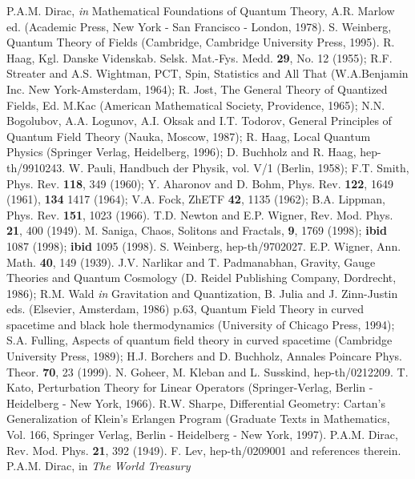 \documentclass[a4paper,12pt]{article}%
\begin{document}
\begin{thebibliography}{99}
 P.A.M. Dirac, {\it in} Mathematical Foundations of
Quantum Theory, A.R. Marlow ed. (Academic Press, New York -
San Francisco - London, 1978).
 S. Weinberg, Quantum Theory of Fields  
(Cambridge, Cambridge University Press, 1995).
 R. Haag, Kgl. Danske Videnskab. Selsk. Mat.-Fys. Medd.
{\bf 29}, No. 12  (1955); R.F. Streater and A.S. Wightman, 
PCT, Spin, Statistics and All That (W.A.Benjamin Inc. 
New York-Amsterdam, 1964);
R. Jost, The General Theory of Quantized Fields, Ed. M.Kac
(American Mathematical Society, Providence, 1965);
N.N. Bogolubov, A.A. Logunov, A.I. Oksak and I.T. Todorov,
General Principles of Quantum Field Theory (Nauka, Moscow, 1987);
R. Haag, Local Quantum Physics (Springer Verlag,
Heidelberg, 1996); D. Buchholz and R. Haag, hep-th/9910243.
 W. Pauli, Handbuch der Physik, vol. V/1
(Berlin, 1958); F.T. Smith, Phys. Rev. {\bf 118}, 349 (1960);
Y. Aharonov and D. Bohm, Phys. Rev. {\bf 122}, 1649 (1961),
{\bf 134} 1417 (1964); V.A. Fock, ZhETF {\bf 42}, 1135 (1962);
B.A. Lippman, Phys. Rev. {\bf 151}, 1023 (1966).
 T.D. Newton and E.P. Wigner, Rev. Mod. Phys.
{\bf 21}, 400 (1949). 
 M. Saniga, Chaos, Solitons and Fractals, 
{\bf 9}, 1769 (1998);  {\bf ibid} 1087 (1998); {\bf ibid}
1095 (1998).
 S. Weinberg, hep-th/9702027.
 E.P. Wigner, Ann. Math. {\bf 40}, 149 (1939).
 J.V. Narlikar and T. Padmanabhan,
Gravity, Gauge Theories and Quantum Cosmology (D. Reidel
Publishing Company, Dordrecht, 1986);
R.M. Wald {\it in} Gravitation and
Quantization, B. Julia and J. Zinn-Justin eds. (Elsevier,
Amsterdam, 1986) p.63, Quantum Field Theory in curved
spacetime and black hole thermodynamics (University of
Chicago Press, 1994);
S.A. Fulling, Aspects of quantum field
theory in curved spacetime (Cambridge University Press, 1989);
H.J. Borchers and D. Buchholz, Annales Poincare Phys.
Theor. {\bf 70}, 23 (1999).
 N. Goheer, M. Kleban and L. Susskind,
hep-th/0212209.
 T. Kato, Perturbation Theory for Linear
Operators (Springer-Verlag, Berlin - Heidelberg - New York,
1966). 
 R.W. Sharpe, Differential Geometry: Cartan's
Generalization of Klein's Erlangen Program (Graduate Texts
in Mathematics, Vol. 166, Springer Verlag, 
Berlin - Heidelberg - New York, 1997).
 P.A.M. Dirac, Rev. Mod. Phys. {\bf 21}, 392 (1949).
 F. Lev, hep-th/0209001 and references therein.
 P.A.M. Dirac, in {\it The World Treasury
}
\end{thebibliography}
\end{document}
